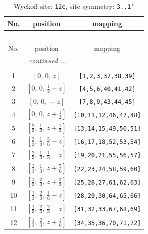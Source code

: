 \documentclass[fleqn,8pt]{jsarticle}
\begin{document}
\begin{longtable}{ccc}
\caption{Wyckoff site: {\tt 12c}, site symmetry: {\tt 3..1'}}
 \\
 \hline \hline
No. & position & mapping \\ \hline \endfirsthead

\multicolumn{2}{l}{\tablename\ \thetable{}} \\
 \hline \hline
No. & position & mapping \\ \hline \endhead

 \hline \hline
\multicolumn{2}{r}{\footnotesize\it continued ...} \\ \endfoot

 \hline \hline
\multicolumn{2}{r}{} \\ \endlastfoot

1 & $\left[ 0,\, 0,\, z \right]$ & {\tt [1,2,3,37,38,39]} \\ \hline
2 & $\left[ 0,\, 0,\, \frac{1}{2} - z \right]$ & {\tt [4,5,6,40,41,42]} \\ \hline
3 & $\left[ 0,\, 0,\, - z \right]$ & {\tt [7,8,9,43,44,45]} \\ \hline
4 & $\left[ 0,\, 0,\, z + \frac{1}{2} \right]$ & {\tt [10,11,12,46,47,48]} \\ \hline
5 & $\left[ \frac{2}{3},\, \frac{1}{3},\, z + \frac{1}{3} \right]$ & {\tt [13,14,15,49,50,51]} \\ \hline
6 & $\left[ \frac{2}{3},\, \frac{1}{3},\, \frac{5}{6} - z \right]$ & {\tt [16,17,18,52,53,54]} \\ \hline
7 & $\left[ \frac{2}{3},\, \frac{1}{3},\, \frac{1}{3} - z \right]$ & {\tt [19,20,21,55,56,57]} \\ \hline
8 & $\left[ \frac{2}{3},\, \frac{1}{3},\, z + \frac{5}{6} \right]$ & {\tt [22,23,24,58,59,60]} \\ \hline
9 & $\left[ \frac{1}{3},\, \frac{2}{3},\, z + \frac{2}{3} \right]$ & {\tt [25,26,27,61,62,63]} \\ \hline
10 & $\left[ \frac{1}{3},\, \frac{2}{3},\, \frac{1}{6} - z \right]$ & {\tt [28,29,30,64,65,66]} \\ \hline
11 & $\left[ \frac{1}{3},\, \frac{2}{3},\, \frac{2}{3} - z \right]$ & {\tt [31,32,33,67,68,69]} \\ \hline
12 & $\left[ \frac{1}{3},\, \frac{2}{3},\, z + \frac{1}{6} \right]$ & {\tt [34,35,36,70,71,72]} \\
\end{longtable}
\renewcommand{\arraystretch}{1.2}
\end{document}
